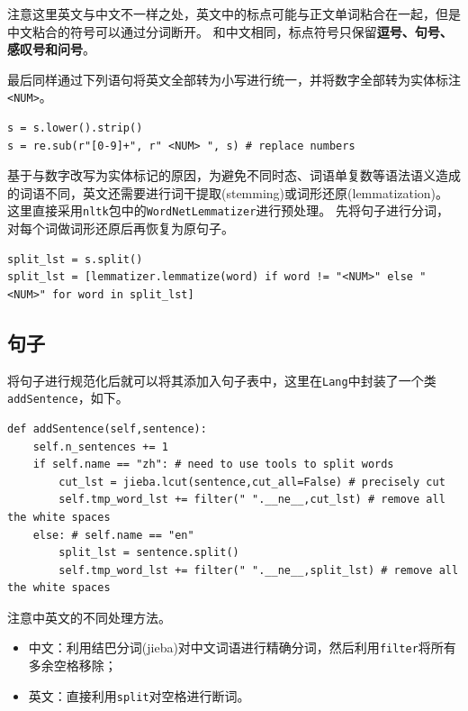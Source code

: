 \documentclass[logo,reportComp]{thesis}
\begin{document}
注意这里英文与中文不一样之处，英文中的标点可能与正文单词粘合在一起，但是中文粘合的符号可以通过分词断开。
和中文相同，标点符号只保留\textbf{逗号、句号、感叹号和问号}。

最后同样通过下列语句将英文全部转为小写进行统一，并将数字全部转为实体标注\verb'<NUM>'。
\begin{lstlisting}
s = s.lower().strip()
s = re.sub(r"[0-9]+", r" <NUM> ", s) # replace numbers
\end{lstlisting}

基于与数字改写为实体标记的原因，为避免不同时态、词语单复数等语法语义造成的词语不同，英文还需要进行词干提取(stemming)或词形还原(lemmatization)\cite{bib:stem}。
这里直接采用\verb'nltk'包中的\verb'WordNetLemmatizer'进行预处理。
先将句子进行分词，对每个词做词形还原后再恢复为原句子。
\begin{lstlisting}
split_lst = s.split()
split_lst = [lemmatizer.lemmatize(word) if word != "<NUM>" else "<NUM>" for word in split_lst]
\end{lstlisting}

\subsection{句子}
\label{sub:sentence}
将句子进行规范化后就可以将其添加入句子表中，这里在\verb'Lang'中封装了一个类\verb'addSentence'，如下。
\begin{lstlisting}
def addSentence(self,sentence):
    self.n_sentences += 1
    if self.name == "zh": # need to use tools to split words
        cut_lst = jieba.lcut(sentence,cut_all=False) # precisely cut
        self.tmp_word_lst += filter(" ".__ne__,cut_lst) # remove all the white spaces
    else: # self.name == "en"
        split_lst = sentence.split()
        self.tmp_word_lst += filter(" ".__ne__,split_lst) # remove all the white spaces
\end{lstlisting}

注意中英文的不同处理方法。
\begin{itemize}
    \item 中文：利用结巴分词(jieba)对中文词语进行精确分词，然后利用\verb'filter'将所有多余空格移除；
    \item 英文：直接利用\verb'split'对空格进行断词。
\end{itemize}
\end{document}
